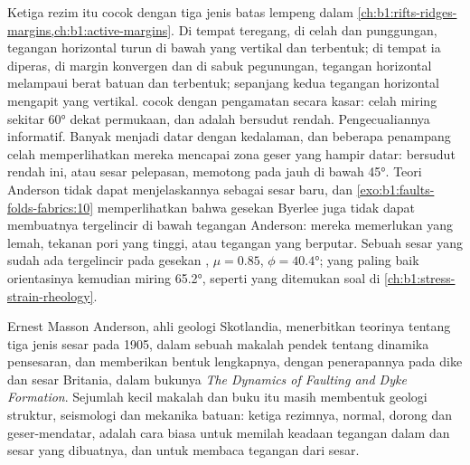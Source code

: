 Ketiga rezim itu cocok dengan tiga jenis batas lempeng dalam \cref{ch:b1:rifts-ridges-margins,ch:b1:active-margins}. Di tempat  teregang, di celah dan punggungan, tegangan horizontal turun di bawah yang vertikal dan  terbentuk; di tempat ia diperas, di margin konvergen dan di sabuk pegunungan, tegangan horizontal melampaui berat batuan dan  terbentuk; sepanjang  kedua tegangan horizontal mengapit yang vertikal.  cocok dengan pengamatan secara kasar:  celah miring sekitar \ang{60} dekat permukaan, dan  adalah  bersudut rendah. Pengecualiannya informatif. Banyak 
menjadi datar dengan kedalaman, dan beberapa penampang celah memperlihatkan mereka mencapai zona geser yang hampir datar:  bersudut rendah ini, atau sesar pelepasan, memotong  pada  jauh di bawah \ang{45}. Teori Anderson tidak dapat menjelaskannya sebagai sesar baru, dan \cref{exo:b1:faults-folds-fabrics:10} memperlihatkan bahwa gesekan Byerlee juga tidak dapat membuatnya tergelincir di bawah tegangan Anderson: mereka memerlukan  yang lemah, tekanan pori yang tinggi, atau tegangan yang berputar. Sebuah sesar yang sudah ada tergelincir pada gesekan , $\mu = 0.85$, $\phi = \ang{40.4}$;  yang paling baik orientasinya kemudian miring \ang{65.2}, seperti yang ditemukan soal di \cref{ch:b1:stress-strain-rheology}.

\begin{history}
Ernest Masson Anderson, ahli geologi Skotlandia, menerbitkan teorinya tentang tiga jenis sesar pada 1905, dalam sebuah makalah pendek tentang dinamika pensesaran, dan memberikan bentuk lengkapnya, dengan penerapannya pada dike dan sesar Britania, dalam bukunya \emph{The Dynamics of Faulting and Dyke Formation}. Sejumlah kecil makalah dan buku itu masih membentuk geologi struktur, seismologi dan mekanika batuan: ketiga rezimnya, normal, dorong dan geser-mendatar, adalah cara biasa untuk memilah keadaan tegangan dalam  dan sesar yang dibuatnya, dan untuk membaca tegangan dari sesar.
\end{history}

